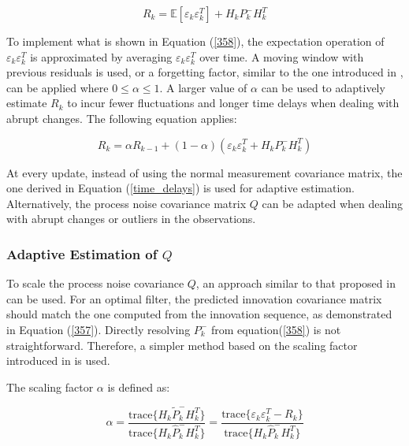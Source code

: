 \begin{equation}
    R_k = \mathbb{E}\left[ \varepsilon_k \varepsilon_k^T \right] + H_k P^-_k H_k^T 
    \label{358}
\end{equation}

To implement what is shown in Equation (\ref{358}), the expectation operation of \(\varepsilon_k \varepsilon_k^T\) is approximated by averaging \(\varepsilon_k \varepsilon_k^T\) over time. A moving window with previous residuals is used, or a forgetting factor, similar to the one introduced in \cite{Akhlaghi2018}, can be applied where \(0 \le \alpha \le 1\). A larger value of \(\alpha\) can be used to adaptively estimate \(R_k\) to incur fewer fluctuations and longer time delays when dealing with abrupt changes. The following equation applies:

\begin{equation}
    R_k = \alpha R_{k-1} + (1-\alpha)(\varepsilon_k \varepsilon_k^T + H_k P^-_k H_k^T)
    \label{time_delays}
\end{equation}

At every update, instead of using the normal measurement covariance matrix, the one derived in Equation (\ref{time_delays}) is used for adaptive estimation. Alternatively, the process noise covariance matrix \(Q\) can be adapted when dealing with abrupt changes or outliers in the observations.

\subsubsection{Adaptive Estimation of \( Q \)}

To scale the process noise covariance \( Q \), an approach similar to that proposed in \cite{Ding2007} can be used. For an optimal filter, the predicted innovation covariance matrix should match the one computed from the innovation sequence, as demonstrated in Equation (\ref{357}). Directly resolving \( P^-_k \) from equation(\ref{358}) is not straightforward. Therefore, a simpler method based on the scaling factor introduced in \cite{Ding2007} is used.

The scaling factor \( \alpha \) is defined as:

\begin{equation}
    \alpha = \frac{\text{trace}\{H_k \tilde{P}^-_k H_k^T\}}{\text{trace}\{H_k \hat{P}^-_k H_k^T\}} = \frac{\text{trace}\{\varepsilon_k \varepsilon_k^T - R_k\}}{\text{trace}\{H_k \hat{P}^-_k H_k^T\}}
\end{equation}

